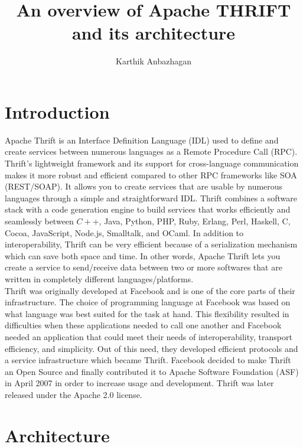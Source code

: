 \documentclass[9pt,twocolumn,twoside]{../../styles/osajnl}
\title{An overview of Apache THRIFT and its architecture}
\author[1]{Karthik Anbazhagan}
\affil[1]{School of Informatics and Computing, Bloomington, IN 47408, U.S.A.}
\affil[*]{Corresponding authors: kartanba@iu.edu}
\begin{document}
\maketitle

\section{Introduction}
Apache Thrift is an Interface Definition Language \cite{www-thrift-idl} (IDL) used to define and create services between numerous languages as a Remote Procedure Call (RPC). Thrift's lightweight framework and its support for cross-language communication makes it more robust and efficient compared to other RPC frameworks like SOA \cite{blog-thrift} (REST/SOAP). It allows you to create services that are usable by numerous languages through a simple and straightforward IDL. Thrift combines a software stack with a code generation engine to build services that works efficiently and seamlessly between $C++$, Java, Python, PHP, Ruby, Erlang, Perl, Haskell, C, Cocoa, JavaScript, Node.js, Smalltalk, and OCaml. In addition to interoperability, Thrift can be very efficient because of a serialization mechanism \cite{git-thrift-serial} which can save both space and time. In other words, Apache Thrift lets you create a service to send/receive data between two or more softwares that are written in completely different languages/platforms. \\

Thrift was originally developed at Facebook and is one of the core parts of their infrastructure. The choice of programming language at Facebook \cite{thrift-paper-2013} was based on what language was best suited for the task at hand. This flexibility resulted in difficulties when these applications needed to call one another and Facebook needed an application that could meet their needs of interoperability, transport efficiency, and simplicity. Out of this need, they developed efficient protocols and a service infrastructure which became Thrift. Facebook  decided to make Thrift an Open Source and finally contributed it to Apache Software Foundation (ASF) in April 2007 in order to increase usage and development. Thrift was later released under the Apache 2.0 license.


\section{Architecture}
\end{document}
